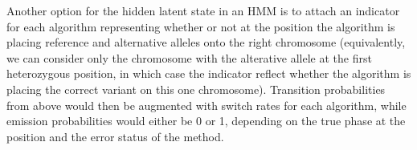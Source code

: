 Another option for the hidden latent state in an HMM is to attach an indicator for each algorithm representing whether or not at the position the algorithm is placing reference and alternative alleles onto the right chromosome (equivalently, we can consider only the chromosome with the alterative allele at the first heterozygous position, in which case the indicator reflect whether the algorithm is placing the correct variant on this one chromosome). Transition probabilities from above would then be augmented with switch rates for each algorithm, while emission probabilities would either be 0 or 1, depending on the true phase at the position and the error status of the method.